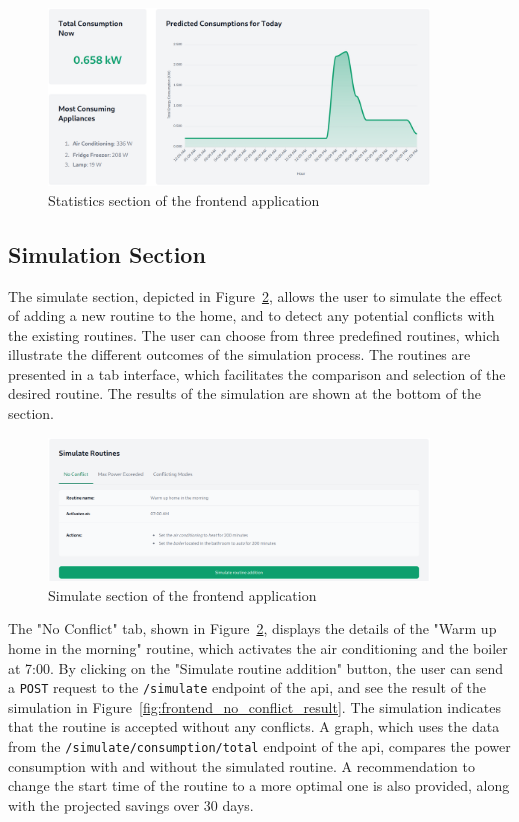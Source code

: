 \begin{figure}
    \centering
    \includegraphics[width=0.9\textwidth]{images/frontend/statistics.png}
    \caption{Statistics section of the frontend application}
    \label{fig:frontend_statistics}
\end{figure}

\subsection{Simulation Section}

The simulate section, depicted in Figure~\ref{fig:frontend_simulate}, allows the user to simulate the effect of adding a new routine to the home, and to detect any potential conflicts with the existing routines. The user can choose from three predefined routines, which illustrate the different outcomes of the simulation process. The routines are presented in a tab interface, which facilitates the comparison and selection of the desired routine. The results of the simulation are shown at the bottom of the section.

\begin{figure}
    \centering
    \includegraphics[width=0.9\textwidth]{images/frontend/simulate.png}
    \caption{Simulate section of the frontend application}
    \label{fig:frontend_simulate}
\end{figure}

The "No Conflict" tab, shown in Figure~\ref{fig:frontend_simulate}, displays the details of the "Warm up home in the morning" routine, which activates the air conditioning and the boiler at 7:00. By clicking on the "Simulate routine addition" button, the user can send a \texttt{POST} request to the \texttt{/simulate} endpoint of the \acrshort{api}, and see the result of the simulation in Figure~\ref{fig:frontend_no_conflict_result}. The simulation indicates that the routine is accepted without any conflicts. A graph, which uses the data from the \texttt{/simulate/consumption/total} endpoint of the \acrshort{api}, compares the power consumption with and without the simulated routine. A recommendation to change the start time of the routine to a more optimal one is also provided, along with the projected savings over 30 days.

